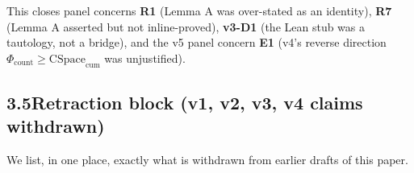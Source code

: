 \documentclass[11pt,a4paper]{article}
\theoremstyle{remark}
\begin{document}
This closes panel concerns \textbf{R1} (Lemma A was over-stated as an
identity), \textbf{R7} (Lemma A asserted but not inline-proved),
\textbf{v3-D1} (the Lean stub was a tautology, not a bridge), and the v5
panel concern \textbf{E1} (v4's reverse direction
$\Phi_{\mathrm{count}} \ge \mathrm{CSpace}_{\mathrm{cum}}$ was unjustified).

\subsection*{3.5\quad Retraction block (v1, v2, v3, v4 claims withdrawn)}

We list, in one place, exactly what is withdrawn from earlier drafts of
this paper.
\end{document}

